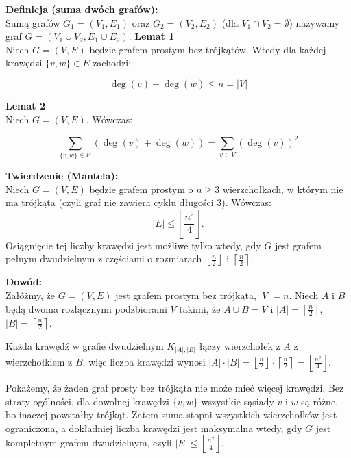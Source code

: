\documentclass{article}
\begin{document}
\textbf{Definicja (suma dwóch grafów):}\\
Sumą grafów $G_1 = (V_1, E_1)$ oraz $G_2 = (V_2, E_2)$ (dla $V_1 \cap V_2 = \emptyset$) nazywamy graf $G = (V_1 \cup V_2, E_1 \cup E_2)$.
\newline
\textbf{Lemat 1}\\
Niech $G = (V, E)$ będzie grafem prostym bez trójkątów. Wtedy dla każdej krawędzi $\{v, w\} \in E$ zachodzi:
\begin{center}
    \[
    \deg(v) + \deg(w) \leq n = |V|
    \]
\end{center}

\vspace{1em}

\textbf{Lemat 2}\\
Niech $G = (V, E)$. Wówczas:
\begin{center}
    \[
    \sum_{\{v, w\} \in E} \left( \deg(v) + \deg(w) \right) = \sum_{v \in V} \left(\deg(v)\right)^2
    \]
\end{center}

\textbf{Twierdzenie (Mantela):}\\
Niech $G = (V, E)$ będzie grafem prostym o $n \geq 3$ wierzchołkach, w którym nie ma trójkąta (czyli graf nie zawiera cyklu długości 3). Wówczas:
\[
|E| \leq \left\lfloor \frac{n^2}{4} \right\rfloor.
\]
Osiągnięcie tej liczby krawędzi jest możliwe tylko wtedy, gdy $G$ jest grafem pełnym dwudzielnym z częściami o rozmiarach $\left\lfloor \frac{n}{2} \right\rfloor$ i $\left\lceil \frac{n}{2} \right\rceil$.

\vspace{1em}

\textbf{Dowód:}\\
Załóżmy, że $G = (V, E)$ jest grafem prostym bez trójkąta, $|V| = n$. Niech $A$ i $B$ będą dwoma rozłącznymi podzbiorami $V$ takimi, że $A \cup B = V$ i $|A| = \left\lfloor \frac{n}{2} \right\rfloor$, $|B| = \left\lceil \frac{n}{2} \right\rceil$. 

Każda krawędź w grafie dwudzielnym $K_{|A|, |B|}$ łączy wierzchołek z $A$ z wierzchołkiem z $B$, więc liczba krawędzi wynosi $|A| \cdot |B| = \left\lfloor \frac{n}{2} \right\rfloor \cdot \left\lceil \frac{n}{2} \right\rceil = \left\lfloor \frac{n^2}{4} \right\rfloor$. 

Pokażemy, że żaden graf prosty bez trójkąta nie może mieć więcej krawędzi. Bez straty ogólności, dla dowolnej krawędzi $\{v, w\}$ wszystkie sąsiady $v$ i $w$ są różne, bo inaczej powstałby trójkąt. Zatem suma stopni wszystkich wierzchołków jest ograniczona, a dokładniej liczba krawędzi jest maksymalna wtedy, gdy $G$ jest kompletnym grafem dwudzielnym, czyli $|E| \leq \left\lfloor \frac{n^2}{4} \right\rfloor$. 
\end{document}
